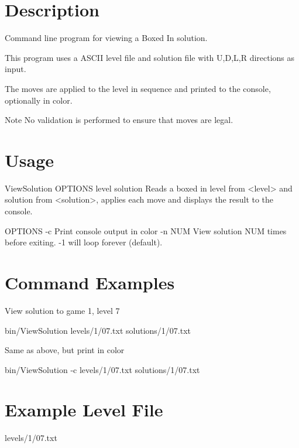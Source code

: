 \hypertarget{viewsolution_page_description_sec}{}\section{Description}\label{viewsolution_page_description_sec}
Command line program for viewing a Boxed In solution.

This program uses a A\+S\+C\+I\+I level file and solution file with U,D,L,R directions as input.

The moves are applied to the level in sequence and printed to the console, optionally in color.

\begin{DoxyNote}{Note}
No validation is performed to ensure that moves are legal.
\end{DoxyNote}
\hypertarget{viewsolution_page_usage_sec}{}\section{Usage}\label{viewsolution_page_usage_sec}
\begin{DoxyVerb}ViewSolution OPTIONS level solution
    Reads a boxed in level from <level> and solution from <solution>, applies
    each move and displays the result to the console.

    OPTIONS
        -c
            Print console output in color
        -n NUM
            View solution NUM times before exiting.
        -1 will loop forever (default).\end{DoxyVerb}
\hypertarget{viewsolution_page_examples_sec}{}\section{Command Examples}\label{viewsolution_page_examples_sec}
View solution to game 1, level 7

\begin{DoxyVerb}bin/ViewSolution levels/1/07.txt solutions/1/07.txt\end{DoxyVerb}


Same as above, but print in color

\begin{DoxyVerb}bin/ViewSolution -c levels/1/07.txt solutions/1/07.txt\end{DoxyVerb}
\hypertarget{viewsolution_page_example_level_file_sec}{}\section{Example Level File}\label{viewsolution_page_example_level_file_sec}
levels/1/07.\+txt

